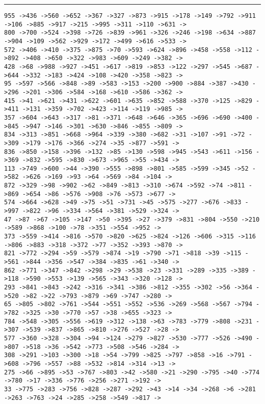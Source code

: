 \documentclass[letter, 12pt]{article}
\newenvironment{question}[1]{%
    \vspace{.2in}%
        \noindent{\bf #1}%
    \vspace{0.3em} \hrule \vspace{.1in}%
}{}
\begin{document}
\begin{question}{\large Appendix}
\begin{lstlisting}[style=CStyle]
955 ->436 ->560 ->652 ->367 ->327 ->873 ->915 ->178 ->149 ->792 ->911 ->106 ->885 ->917 ->215 ->995 ->311 ->110 ->631 ->
800 ->700 ->524 ->398 ->726 ->839 ->961 ->326 ->246 ->198 ->634 ->887 ->904 ->109 ->562 ->929 ->172 ->499 ->616 ->533 ->
572 ->406 ->410 ->375 ->875 ->70 ->593 ->624 ->896 ->458 ->558 ->112 ->892 ->408 ->650 ->322 ->983 ->609 ->249 ->382 ->
428 ->68 ->988 ->927 ->451 ->617 ->819 ->853 ->122 ->297 ->545 ->687 ->644 ->332 ->183 ->424 ->108 ->420 ->358 ->823 ->
95 ->597 ->566 ->848 ->89 ->583 ->153 ->200 ->900 ->884 ->387 ->430 ->296 ->201 ->306 ->584 ->168 ->610 ->586 ->362 ->
415 ->41 ->621 ->431 ->622 ->601 ->635 ->852 ->588 ->370 ->125 ->829 ->411 ->131 ->359 ->702 ->423 ->114 ->119 ->985 ->
357 ->604 ->643 ->317 ->81 ->371 ->648 ->646 ->365 ->696 ->690 ->400 ->845 ->947 ->146 ->301 ->630 ->846 ->855 ->809 ->
834 ->313 ->851 ->668 ->964 ->339 ->380 ->682 ->31 ->107 ->91 ->72 ->309 ->179 ->176 ->366 ->274 ->35 ->877 ->591 ->
836 ->850 ->158 ->396 ->132 ->85 ->130 ->598 ->945 ->543 ->611 ->156 ->369 ->832 ->595 ->830 ->673 ->965 ->55 ->434 ->
113 ->749 ->600 ->44 ->390 ->555 ->898 ->801 ->585 ->599 ->345 ->52 ->582 ->626 ->169 ->93 ->64 ->569 ->84 ->104 ->
872 ->329 ->98 ->902 ->62 ->849 ->813 ->310 ->674 ->592 ->74 ->811 ->869 ->654 ->86 ->576 ->908 ->76 ->573 ->677 ->
574 ->664 ->628 ->49 ->75 ->51 ->731 ->45 ->575 ->277 ->676 ->833 ->997 ->822 ->96 ->334 ->564 ->381 ->529 ->324 ->
47 ->87 ->67 ->105 ->147 ->50 ->395 ->27 ->379 ->831 ->804 ->550 ->210 ->589 ->868 ->100 ->78 ->351 ->554 ->952 ->
373 ->559 ->414 ->816 ->570 ->820 ->625 ->824 ->126 ->606 ->315 ->116 ->806 ->883 ->318 ->372 ->77 ->352 ->393 ->870 ->
821 ->772 ->294 ->59 ->579 ->874 ->19 ->790 ->71 ->818 ->39 ->115 ->561 ->844 ->356 ->547 ->384 ->835 ->61 ->340 ->
862 ->771 ->347 ->842 ->298 ->29 ->538 ->23 ->331 ->289 ->335 ->389 ->118 ->590 ->553 ->139 ->565 ->343 ->320 ->128 ->
293 ->841 ->843 ->242 ->316 ->341 ->386 ->812 ->355 ->302 ->56 ->364 ->520 ->82 ->22 ->793 ->879 ->69 ->747 ->280 ->
65 ->805 ->802 ->761 ->544 ->551 ->552 ->536 ->269 ->568 ->567 ->794 ->782 ->325 ->30 ->770 ->57 ->38 ->655 ->323 ->
784 ->548 ->305 ->556 ->619 ->312 ->138 ->63 ->783 ->779 ->808 ->231 ->307 ->539 ->837 ->865 ->810 ->276 ->527 ->28 ->
577 ->360 ->328 ->304 ->94 ->124 ->279 ->827 ->530 ->777 ->526 ->490 ->807 ->518 ->36 ->542 ->773 ->508 ->546 ->284 ->
308 ->291 ->103 ->300 ->18 ->54 ->799 ->825 ->797 ->858 ->16 ->791 ->608 ->796 ->557 ->88 ->532 ->814 ->314 ->13 ->
275 ->66 ->895 ->53 ->767 ->803 ->42 ->580 ->21 ->290 ->795 ->40 ->774 ->780 ->17 ->336 ->776 ->256 ->271 ->192 ->
33 ->775 ->283 ->756 ->828 ->287 ->292 ->43 ->14 ->34 ->268 ->6 ->281 ->263 ->763 ->24 ->285 ->258 ->549 ->817 ->

\end{lstlisting}
\end{question}
\end{document}

